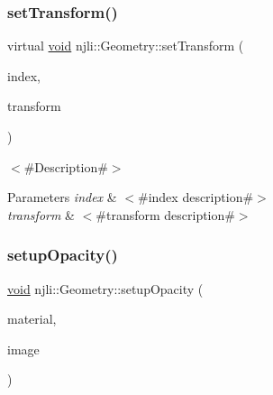 \mbox{\label{classnjli_1_1_geometry_a728c03769da533f7ca74fc967582b632}} 
\subsubsection{\texorpdfstring{set\+Transform()}{setTransform()}}
{\footnotesize\ttfamily virtual \mbox{\hyperlink{_thread_8h_af1e856da2e658414cb2456cb6f7ebc66}{void}} njli\+::\+Geometry\+::set\+Transform (\begin{DoxyParamCaption}\item[{const \mbox{\hyperlink{_util_8h_ad758b7a5c3f18ed79d2fcd23d9f16357}{u64}}}]{index,  }\item[{const bt\+Transform \&}]{transform }\end{DoxyParamCaption})\hspace{0.3cm}{\ttfamily [virtual]}}

$<$\#\+Description\#$>$


\begin{DoxyParams}{Parameters}
{\em index} & $<$\#index description\#$>$ \\
\hline
{\em transform} & $<$\#transform description\#$>$ \\
\hline
\end{DoxyParams}
\mbox{\label{classnjli_1_1_geometry_a6c736d40f50aa200248ff2fffe362446}} 
\subsubsection{\texorpdfstring{setup\+Opacity()}{setupOpacity()}}
{\footnotesize\ttfamily \mbox{\hyperlink{_thread_8h_af1e856da2e658414cb2456cb6f7ebc66}{void}} njli\+::\+Geometry\+::setup\+Opacity (\begin{DoxyParamCaption}\item[{\mbox{\hyperlink{classnjli_1_1_material}{Material}} $\ast$}]{material,  }\item[{\mbox{\hyperlink{classnjli_1_1_image}{Image}} $\ast$}]{image }\end{DoxyParamCaption})}

\mbox{\label{classnjli_1_1_geometry_aca4922f34c4daa4f3e6209c3ed5c2609}} 

